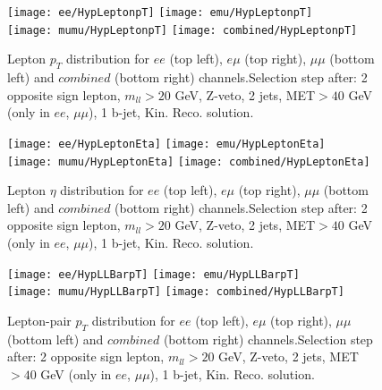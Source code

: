 \documentclass[12pt, a4paper, titlepage]{article}
\begin{document}
\clearpage
\newpage



\begin{figure}
  \texttt{[image: ee/HypLeptonpT]}
  \texttt{[image: emu/HypLeptonpT]}\\
  \texttt{[image: mumu/HypLeptonpT]}
  \texttt{[image: combined/HypLeptonpT]}
\caption{Lepton $p_T$ distribution for $ee$ (top left), $e\mu$ (top right), $\mu\mu$ (bottom left) and $combined$ (bottom right) channels.\newline Selection step after: 2 opposite sign lepton, $m_{ll}>20$ GeV, Z-veto, 2 jets, MET$>40$ GeV (only in $ee$, $\mu\mu$), 1 b-jet, Kin. Reco. solution.}
\end{figure}

\clearpage
\newpage


\begin{figure}
  \texttt{[image: ee/HypLeptonEta]}
  \texttt{[image: emu/HypLeptonEta]}\\
  \texttt{[image: mumu/HypLeptonEta]}
  \texttt{[image: combined/HypLeptonEta]}
\caption{Lepton $\eta$ distribution for $ee$ (top left), $e\mu$ (top right), $\mu\mu$ (bottom left) and $combined$ (bottom right) channels.\newline Selection step after: 2 opposite sign lepton, $m_{ll}>20$ GeV, Z-veto, 2 jets, MET$>40$ GeV (only in $ee$, $\mu\mu$), 1 b-jet, Kin. Reco. solution.}
\end{figure}

\clearpage
\newpage


\begin{figure}
  \texttt{[image: ee/HypLLBarpT]}
  \texttt{[image: emu/HypLLBarpT]}\\
  \texttt{[image: mumu/HypLLBarpT]}
  \texttt{[image: combined/HypLLBarpT]}
\caption{Lepton-pair $p_T$ distribution for $ee$ (top left), $e\mu$ (top right), $\mu\mu$ (bottom left) and $combined$ (bottom right) channels.\newline Selection step after: 2 opposite sign lepton, $m_{ll}>20$ GeV, Z-veto, 2 jets, MET$>40$ GeV (only in $ee$, $\mu\mu$), 1 b-jet, Kin. Reco. solution.}
\end{figure}
\end{document}
